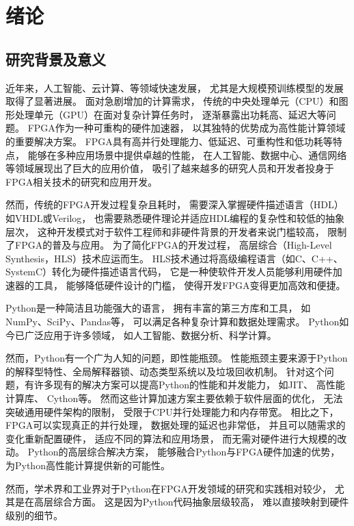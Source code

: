 \section{绪论}

\subsection{研究背景及意义}

近年来，人工智能、云计算、等领域快速发展，
尤其是大规模预训练模型的发展取得了显著进展。
面对急剧增加的计算需求，
传统的中央处理单元（CPU）和图形处理单元（GPU）在面对复杂计算任务时，
逐渐暴露出功耗高、延迟大等问题。
FPGA作为一种可重构的硬件加速器，
以其独特的优势成为高性能计算领域的重要解决方案。
FPGA具有高并行处理能力、低延迟、可重构性和低功耗等特点，
能够在多种应用场景中提供卓越的性能，
在人工智能\cite{zeng2024flightllm}、数据中心、通信网络等领域展现出了巨大的应用价值，
吸引了越来越多的研究人员和开发者投身于FPGA相关技术的研究和应用开发。

然而，传统的FPGA开发过程复杂且耗时，
需要深入掌握硬件描述语言（HDL）如VHDL或Verilog，
也需要熟悉硬件理论并适应HDL编程的复杂性和较低的抽象层次，
这种开发模式对于软件工程师和非硬件背景的开发者来说门槛较高，
限制了FPGA的普及与应用。
为了简化FPGA的开发过程，
高层综合（High-Level Synthesis，HLS）技术应运而生。
HLS技术通过将高级编程语言（如C、C++、SystemC）转化为硬件描述语言代码，
它是一种使软件开发人员能够利用硬件加速器的工具，
能够降低硬件设计的门槛，
使得开发FPGA变得更加高效和便捷。

Python是一种简洁且功能强大的语言，
拥有丰富的第三方库和工具，
如NumPy、SciPy、Pandas等，
可以满足各种复杂计算和数据处理需求。
Python如今已广泛应用于许多领域，
如人工智能、数据分析、科学计算。

然而，Python有一个广为人知的问题，即性能瓶颈。
性能瓶颈主要来源于Python的解释型特性、全局解释器锁、动态类型系统以及垃圾回收机制。
针对这个问题，有许多现有的解决方案可以提高Python的性能和并发能力，
如JIT\cite{rpython}\cite{pypy1}\cite{izawa2022threaded}\cite{pypy2}、
高性能计算库\cite{harris2020array}、
Cython\cite{cython}等。
然而这些计算加速方案主要依赖于软件层面的优化，
无法突破通用硬件架构的限制，
受限于CPU并行处理能力和内存带宽。
相比之下，FPGA可以实现真正的并行处理，
数据处理的延迟也非常低，
并且可以随需求的变化重新配置硬件，
适应不同的算法和应用场景，
而无需对硬件进行大规模的改动。
Python的高层综合解决方案，
能够融合Python与FPGA硬件加速的优势，
为Python高性能计算提供新的可能性。

然而，学术界和工业界对于Python在FPGA开发领域的研究和实践相对较少，
尤其是在高层综合方面。
这是因为Python代码抽象层级较高，
难以直接映射到硬件级别的细节。

